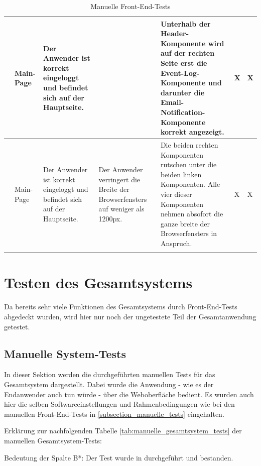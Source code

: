\begin{longtable}{| p{} | p{} | p{} | p{} | p{} | p{} | p{} |}
	\stepcounter{TestNumber}\arabic{TestNumber} & Main-Page & Der Anwender ist korrekt eingeloggt und befindet sich auf der Hauptseite. & & Unterhalb der Header-Komponente wird auf der rechten Seite erst die Event-Log-Komponente und darunter die Email-Notification-Komponente korrekt angezeigt. & X & X \\ \hline
	
	\stepcounter{TestNumber}\arabic{TestNumber} & Main-Page & Der Anwender ist korrekt eingeloggt und befindet sich auf der Hauptseite. & Der Anwender verringert die Breite der Browserfensters auf weniger als 1200px. & Die beiden rechten Komponenten rutschen unter die beiden linken Komponenten. Alle vier dieser Komponenten nehmen absofort die ganze breite der Browserfensters in Anspruch. & X & X \\ \hline
	
	\caption{Manuelle Front-End-Tests}
	\label{tab:manuelle_front_end_tests}
\end{longtable}

\section{Testen des Gesamtsystems}
Da bereits sehr viele Funktionen des Gesamtsystems durch Front-End-Tests abgedeckt wurden, wird hier nur noch der ungetestete Teil der Gesamtanwendung getestet.

\subsection{Manuelle System-Tests}
In dieser Sektion werden die durchgeführten manuellen Tests für das Gesamtsystem dargestellt. Dabei wurde die Anwendung - wie es der Endanwender auch tun würde - über die Weboberfläche bedient. Es wurden auch hier die selben Softwareeinstellungen und Rahmenbedingungen wie bei den manuellen Front-End-Tests in \ref{subsection_manuelle_tests} eingehalten. 

Erklärung zur nachfolgenden Tabelle \ref{tab:manuelle_gesamtsystem_tests} der manuellen Gesamtsystem-Tests:\newline

Bedeutung der Spalte B*: Der Test wurde in durchgeführt und bestanden.

\vspace{0.5cm}

